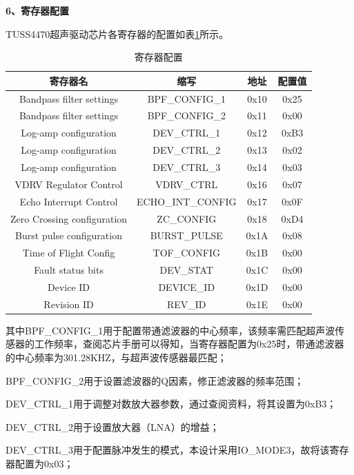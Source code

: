     
    \noindent
    \textbf{6、寄存器配置}\par
    TUSS4470超声驱动芯片各寄存器的配置如表\ref{寄存器配置}所示。
      \begin{table}[H]
        \centering
        \caption{寄存器配置}
        \songti{}
        \begin{tabular}{c|c|c|c}
        \hline
        \textbf{寄存器名} & \textbf{缩写}& \textbf{地址} &\textbf{配置值}\\ \hline
        Bandpass filter settings&BPF\_CONFIG\_1&0x10& 0x25 \\ \hline
        Bandpass filter settings&BPF\_CONFIG\_2&0x11& 0x00\\ \hline
        Log-amp configuration&DEV\_CTRL\_1&0x12& 0xB3\\ \hline
        Log-amp configuration&DEV\_CTRL\_2&0x13& 0x02\\ \hline
        Log-amp configuration&DEV\_CTRL\_3&0x14& 0x03\\ \hline
        VDRV Regulator Control&VDRV\_CTRL&0x16& 0x07\\ \hline
        Echo Interrupt Control &ECHO\_INT\_CONFIG&0x17&0x0F \\ \hline  
        Zero Crossing configuration &ZC\_CONFIG&0x18& 0xD4\\ \hline 
        Burst pulse configuration &BURST\_PULSE&0x1A& 0x08\\ \hline 
        Time of Flight Config&TOF\_CONFIG&0x1B& 0x00\\ \hline 
        Fault status bits&DEV\_STAT&0x1C& 0x00\\ \hline
        Device ID&DEVICE\_ID&0x1D& 0x00\\ \hline
        Revision ID &REV\_ID&0x1E& 0x00\\ \hline
        
            \end{tabular}
        \label{寄存器配置}    
         \end{table}
    其中BPF\_CONFIG\_1用于配置带通滤波器的中心频率，该频率需匹配超声波传感器的工作频率，查阅芯片手册可以得知，当寄存器配置为0x25时，带通滤波器的中心频率为301.28KHZ，与超声波传感器最匹配；\par
    BPF\_CONFIG\_2用于设置滤波器的Q因素，修正滤波器的频率范围；\par
    DEV\_CTRL\_1用于调整对数放大器参数，通过查阅资料，将其设置为0xB3；\par
    DEV\_CTRL\_2用于设置放大器（LNA）的增益；\par
    DEV\_CTRL\_3用于配置脉冲发生的模式，本设计采用IO\_MODE3，故将该寄存器配置为0x03；\par
